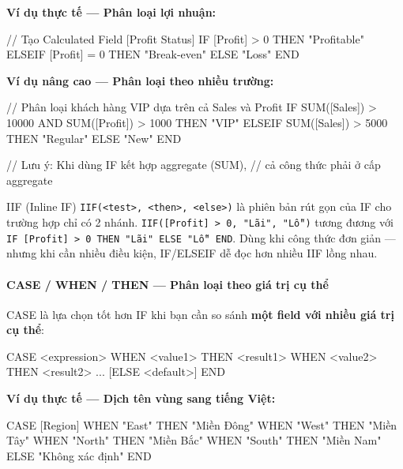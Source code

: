 \documentclass[12pt]{article}
\begin{document}
\noindent \textbf{Ví dụ thực tế --- Phân loại lợi nhuận:}

\begin{aivncodebox}[]
\begin{python}
// Tạo Calculated Field [Profit Status]
IF [Profit] > 0 THEN "Profitable"
ELSEIF [Profit] = 0 THEN "Break-even"
ELSE "Loss"
END
\end{python}
\end{aivncodebox}

\noindent \textbf{Ví dụ nâng cao --- Phân loại theo nhiều trường:}

\begin{aivncodebox}[]
\begin{python}
// Phân loại khách hàng VIP dựa trên cả Sales và Profit
IF SUM([Sales]) > 10000 AND SUM([Profit]) > 1000
THEN "VIP"
ELSEIF SUM([Sales]) > 5000
THEN "Regular"
ELSE "New"
END

// Lưu ý: Khi dùng IF kết hợp aggregate (SUM),
// cả công thức phải ở cấp aggregate
\end{python}
\end{aivncodebox}

\begin{conceptbox}{IIF (Inline IF)}
\texttt{IIF(<test>, <then>, <else>)} là phiên bản rút gọn của IF cho trường hợp chỉ có 2 nhánh. \texttt{IIF([Profit] > 0, "Lãi", "Lỗ")} tương đương với \texttt{IF [Profit] > 0 THEN "Lãi" ELSE "Lỗ" END}. Dùng khi công thức đơn giản --- nhưng khi cần nhiều điều kiện, IF/ELSEIF dễ đọc hơn nhiều IIF lồng nhau.
\end{conceptbox}

\paragraph{CASE / WHEN / THEN --- Phân loại theo giá trị cụ thể}

\noindent CASE là lựa chọn tốt hơn IF khi bạn cần so sánh \textbf{một field với nhiều giá trị cụ thể}:

\begin{aivncodebox}[]
\begin{python}
CASE <expression>
WHEN <value1> THEN <result1>
WHEN <value2> THEN <result2>
...
[ELSE <default>]
END
\end{python}
\end{aivncodebox}

\noindent \textbf{Ví dụ thực tế --- Dịch tên vùng sang tiếng Việt:}

\begin{aivncodebox}[]
\begin{python}
CASE [Region]
WHEN "East" THEN "Miền Đông"
WHEN "West" THEN "Miền Tây"
WHEN "North" THEN "Miền Bắc"
WHEN "South" THEN "Miền Nam"
ELSE "Không xác định"
END
\end{python}
\end{aivncodebox}
\end{document}
